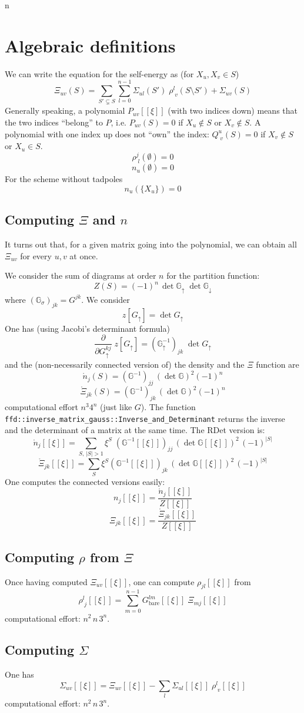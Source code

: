 n\section{Algebraic definitions}
We can write the equation for the self-energy as (for $X_u, X_v\in S$)
$$
\Xi_{uv}(S)= \sum_{S'\subsetneq S}\sum_{l=0}^{n-1} \Sigma_{ul}(S') \;\rho_{\;v}^l(S\setminus S') + \Sigma_{uv}(S)
$$
Generally speaking, a polynomial $P_{uv}[[\xi]]$ (with two indices down) means that the two indices ``belong'' to $P$, i.e. $P_{uv}(S) = 0$ if $X_u\notin S$ or $X_v\notin S$. A polynomial with one index up does not ``own'' the index: $Q_{\;v}^u(S)=0$ if $X_v\notin S$ or $X_u\in S$.
$$
\rho_{\;l}^j(\emptyset) = 0
$$
$$
n_u(\emptyset) = 0
$$
For the scheme without tadpoles
$$
n_u(\{X_u\})= 0 
$$
\subsection{Computing $\Xi$ and $n$}
It turns out that, for a given matrix going into the polynomial, we can obtain all $\Xi_{uv}$ for every $u,v$ at once.

We consider the sum of diagrams at order $n$ for the partition function:
$$
Z(S)=(-1)^n\,\det \mathbb{G}_{\uparrow}\;\det \mathbb{G}_{\downarrow}
$$
where $(\mathbb{G}_\sigma)_{jk} = G^{jk}$. We consider
$$
z[G_\uparrow]=\det G_\uparrow
$$
One has (using Jacobi's determinant formula)
$$
\frac{\partial}{\partial G_{\uparrow}^{kj}} \;z[G_\uparrow]=\left(\mathbb{G}_\uparrow^{-1}\right)_{jk}\;\det G_\uparrow
$$
and the (non-necessarily connected version of) the density and the $\Xi$ function are
$$
\mathring{n}_j(S) = (\mathbb{G}^{-1})_{jj}\, (\det \mathbb{G})^2 (-1)^n
$$
$$
\mathring{\Xi}_{jk}(S) = (\mathbb{G}^{-1})_{jk}\, (\det \mathbb{G})^2 (-1)^n
$$
computational effort $n^3 4^n$ (just like $G$). The function \texttt{ffd::inverse\_matrix\_gauss::Inverse\_and\_Determinant} returns the inverse and the determinant of a matrix at the same time. The RDet version is:
$$
\mathring{n}_j[[\xi]]= \sum_{S,\, |S|>1}\xi^S\;(\mathbb{G}^{-1}[[\xi]])_{jj}\, (\det \mathbb{G}[[\xi]])^2\,(-1)^{|S|}
$$
$$
\mathring{\Xi}_{jk}[[\xi]] = \sum_S \xi^S(\mathbb{G}^{-1}[[\xi]])_{jk}\, (\det \mathbb{G}[[\xi]])^2\,(-1)^{|S|}
$$
One computes the connected versions easily:
$$
n_j[[\xi]]=\frac{\mathring{n}_j[[\xi]]}{Z[[\xi]]}
$$
$$
\Xi_{jk}[[\xi]]=\frac{\mathring{\Xi}_{jk}[[\xi]]}{Z[[\xi]]}
$$
\subsection{Computing $\rho$ from $\Xi$}
Once having computed $\Xi_{uv}[[\xi]]$, one can compute $\rho_{jl}[[\xi]]$ from
$$
\rho_{\;j}^l[[\xi]]= \sum_{m=0}^{n-1} G_{\text{bare}}^{lm}[[\xi]]\; \Xi_{mj}[[\xi]]
$$
computational effort: $n^2\,n\,3^n$.
\subsection{Computing $\Sigma$}
One has
$$
\Sigma_{uv}[[\xi]] = \Xi_{uv}[[\xi]] - \sum_{l} \Sigma_{ul}[[\xi]] \;\rho_{\;v}^l[[\xi]]
$$
computational effort: $n^2\, n \,3^n$.
